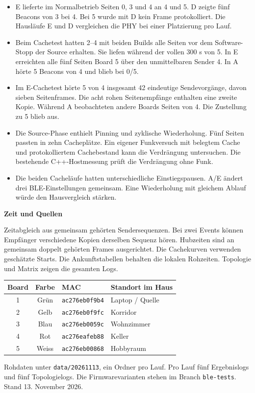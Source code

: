 \documentclass[a4paper,11pt]{article}
\begin{document}
\begin{itemize}
\item E lieferte im Normalbetrieb Seiten 0, 3 und 4 an 4 und 5. D zeigte fünf Beacons von 3 bei 4. Bei 5 wurde mit D kein Frame protokolliert. Die Hausläufe E und D vergleichen die PHY bei einer Platzierung pro Lauf.
\item Beim Cachetest hatten 2--4 mit beiden Builds alle Seiten vor dem Software-Stopp der Source erhalten. Sie liefen während der vollen 300 s von 5. In E erreichten alle fünf Seiten Board 5 über den unmittelbaren Sender 4. In A hörte 5 Beacons von 4 und blieb bei 0/5.
\item Im E-Cachetest hörte 5 von 4 insgesamt 42 eindeutige Sendevorgänge, davon sieben Seitenframes. Die acht rohen Seitenempfänge enthalten eine zweite Kopie. Während A beobachteten andere Boards Seiten von 4. Die Zustellung zu 5 blieb aus.
\item Die Source-Phase enthielt Pinning und zyklische Wiederholung. Fünf Seiten passten in zehn Cacheplätze. Ein eigener Funkversuch mit belegtem Cache und protokolliertem Cachebestand kann die Verdrängung untersuchen. Die bestehende C++-Hostmessung prüft die Verdrängung ohne Funk.
\item Die beiden Cacheläufe hatten unterschiedliche Einstiegspausen. A/E ändert drei BLE-Einstellungen gemeinsam. Eine Wiederholung mit gleichem Ablauf würde den Hausvergleich stärken.
\end{itemize}

\textbf{Zeit und Quellen}

{\small Zeitabgleich aus gemeinsam gehörten Sendersequenzen. Bei zwei Events können Empfänger verschiedene Kopien derselben Sequenz hören. Hubzeiten sind an gemeinsam doppelt gehörten Frames ausgerichtet. Die Cachekurven verwenden geschätzte Starts. Die Ankunftstabellen behalten die lokalen Rohzeiten. Topologie und Matrix zeigen die gesamten Logs.}

\begin{center}\footnotesize
\begin{tabular}{ccll}\toprule
Board & Farbe & MAC & Standort im Haus \\ \midrule
1 & Grün & \texttt{ac276eb0f9b4} & Laptop / Quelle \\
2 & Gelb & \texttt{ac276eb0f9fc} & Korridor \\
3 & Blau & \texttt{ac276eb0059c} & Wohnzimmer \\
4 & Rot & \texttt{ac276eafeb88} & Keller \\
5 & Weiss & \texttt{ac276eb00868} & Hobbyraum \\
\bottomrule\end{tabular}\end{center}

{\small Rohdaten unter \texttt{data/20261113}, ein Ordner pro Lauf. Pro Lauf fünf Ergebnislogs und fünf Topologielogs. Die Firmwarevarianten stehen im Branch \texttt{ble-tests}. Stand 13. November 2026.}
\end{document}
